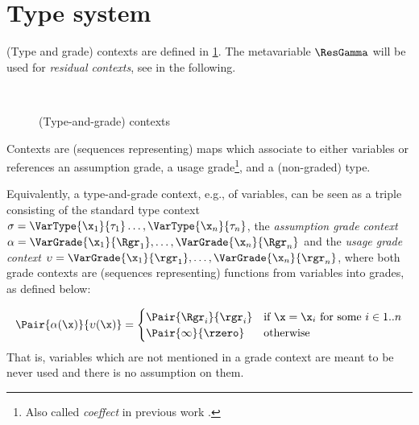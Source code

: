 
\section{Type system}\label{sect:typesystem}

(Type and grade) contexts are defined in \cref{fig:ctx}.  The metavariable $\ResGamma$ will be used for \emph{residual contexts}, see in the following.

\begin{figure}[ht]
\begin{grammatica} 
\\[1ex]
\end{grammatica}
\caption{(Type-and-grade) contexts}
\label{fig:ctx}
\end{figure}

Contexts are (sequences representing) maps which associate to either variables or references an assumption grade, a usage grade\footnote{Also called \emph{coeffect} in previous work \cite{PetricekOM13,PetricekOM14,BrunelGMZ14}.}, and a (non-graded) type.  

Equivalently, a type-and-grade context, e.g., of variables, can be seen as a triple consisting of the standard type context ${\sigma=\VarType{\x_1}{\tau_1}\ldots,\VarType{\x_n}{\tau_n}}$, the \emph{assumption grade context} $\alpha=\VarGrade{\x_1}{\Rgr_1}, \ldots, \VarGrade{\x_n}{\Rgr_n}$ and the \emph{usage grade context} ${\upsilon=\VarGrade{\x_1}{\rgr_1}, \ldots, \VarGrade{\x_n}{\rgr_n}}$, where both grade contexts are (sequences representing) functions from variables into grades, as defined below:

$$
 \Pair{\alpha(\x)}{\upsilon(\x)}=
 \begin{cases}
 \Pair{\Rgr_i}{\rgr_i}& \mbox{if}\ \x=\x_i\ \mbox{for some}\ i\in 1..n\\
\Pair{\infty}{\rzero}&\mbox{otherwise}
\end{cases}
$$
That is, variables which are not mentioned in a grade context are meant to be never used and there is no assumption on them. 

